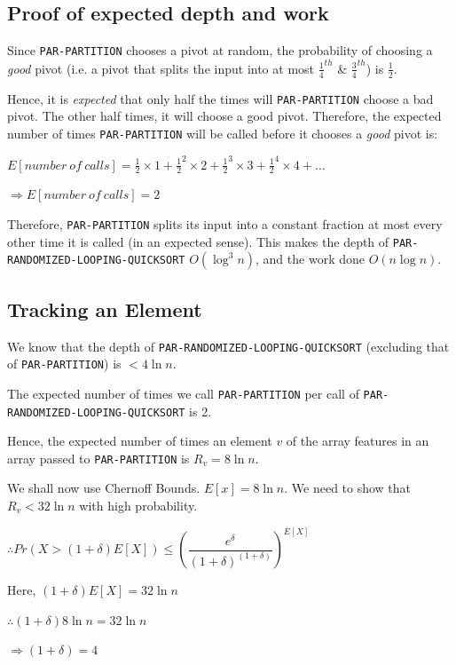 \documentclass{article}
\begin{document}
\subsection{Proof of expected depth and work}

Since \texttt{PAR-PARTITION} chooses a pivot at random, the
probability of choosing a \textit{good} pivot (i.e. a pivot that
splits the input into at most $\frac{1}{4}^{th}$ \&
$\frac{3}{4}^{th}$) is $\frac{1}{2}$.

Hence, it is \textit{expected} that only half the times will
\texttt{PAR-PARTITION} choose a bad pivot. The other half times, it
will choose a good pivot. Therefore, the expected number of times
\texttt{PAR-PARTITION} will be called before it chooses a
\textit{good} pivot is:

$E[number\ of\ calls] = \frac{1}{2} \times 1 + \frac{1}{2}^2 \times 2 +
\frac{1}{2}^3 \times 3 + \frac{1}{2}^4 \times 4 + \ldots$

$\Rightarrow E[number\ of\ calls] = 2$

Therefore, \texttt{PAR-PARTITION} splits its input into a constant
fraction at most every other time it is called (in an expected
sense). This makes the depth of
\texttt{PAR-RANDOMIZED-LOOPING-QUICKSORT} $O(\log^{3}{n})$, and the
work done $O(n\log{n})$.

\subsection{Tracking an Element}

We know that the depth of \texttt{PAR-RANDOMIZED-LOOPING-QUICKSORT}
(excluding that of \texttt{PAR-PARTITION}) is $< 4\ln{n}$.

The expected number of times we call \texttt{PAR-PARTITION} per call
of \texttt{PAR-RANDOMIZED-LOOPING-QUICKSORT} is 2.

Hence, the expected number of times an element $v$ of the array
features in an array passed to \texttt{PAR-PARTITION} is $R_v =
8\ln{n}$.

We shall now use Chernoff Bounds. $E[x] = 8\ln{n}$. We need to show
that $R_v < 32\ln{n}$ with high probability.

$\therefore Pr(X > (1 + \delta)E[X]) \le 
\left(\dfrac{e^\delta}{(1+\delta)^{(1+\delta)}}\right)^{E[X]}$

Here, $(1 + \delta)E[X] = 32\ln{n}$

$\therefore (1+\delta)8\ln{n} = 32\ln{n}$

$\Rightarrow (1+\delta) = 4$
\end{document}
